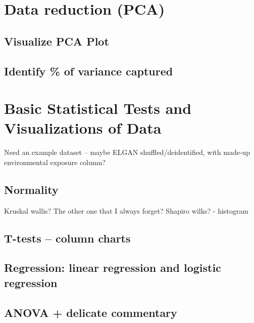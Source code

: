 \documentclass[
]{book}
\begin{document}
\hypertarget{data-reduction-pca}{%
\section{Data reduction (PCA)}\label{data-reduction-pca}}

\hypertarget{visualize-pca-plot}{%
\subsection{Visualize PCA Plot}\label{visualize-pca-plot}}

\hypertarget{identify-of-variance-captured}{%
\subsection{Identify \% of variance captured}\label{identify-of-variance-captured}}

\hypertarget{basic-statistical-tests-and-visualizations-of-data}{%
\section{Basic Statistical Tests and Visualizations of Data}\label{basic-statistical-tests-and-visualizations-of-data}}

Need an example dataset -- maybe ELGAN shuffled/deidentified, with made-up environmental exposure column?

\hypertarget{normality}{%
\subsection{Normality}\label{normality}}

Kruskal wallis? The other one that I always forget? Shapiro wilks? - histogram

\hypertarget{t-tests-column-charts}{%
\subsection{T-tests -- column charts}\label{t-tests-column-charts}}

\hypertarget{regression-linear-regression-and-logistic-regression}{%
\subsection{Regression: linear regression and logistic regression}\label{regression-linear-regression-and-logistic-regression}}

\hypertarget{anova-delicate-commentary}{%
\subsection{ANOVA + delicate commentary}\label{anova-delicate-commentary}}
\end{document}
